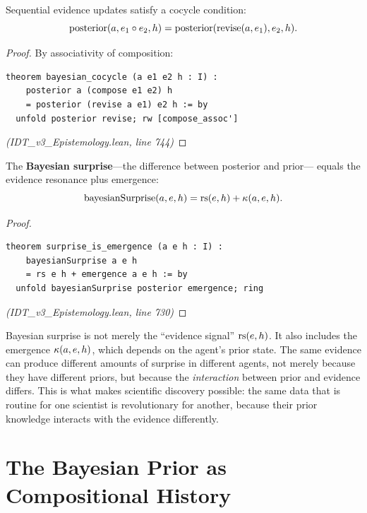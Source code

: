 \begin{theorem}
\label{thm:bayesian-cocycle}
Sequential evidence updates satisfy a cocycle condition:
\[
  \mathrm{posterior}(a, e_1 \circ e_2, h) = \mathrm{posterior}(\mathrm{revise}(a, e_1), e_2, h).
\]
\end{theorem}

\begin{proof}
By associativity of composition:
\begin{lstlisting}
theorem bayesian_cocycle (a e1 e2 h : I) :
    posterior a (compose e1 e2) h
    = posterior (revise a e1) e2 h := by
  unfold posterior revise; rw [compose_assoc']
\end{lstlisting}
\textit{(IDT\_v3\_Epistemology.lean, line 744)}
\end{proof}

\begin{theorem}
\label{thm:surprise-emergence}
The \textbf{Bayesian surprise}---the difference between posterior and prior---
equals the evidence resonance plus emergence:
\[
  \mathrm{bayesianSurprise}(a, e, h) = \mathrm{rs}(e, h) + \kappa(a, e, h).
\]
\end{theorem}

\begin{proof}
\begin{lstlisting}
theorem surprise_is_emergence (a e h : I) :
    bayesianSurprise a e h
    = rs e h + emergence a e h := by
  unfold bayesianSurprise posterior emergence; ring
\end{lstlisting}
\textit{(IDT\_v3\_Epistemology.lean, line 730)}
\end{proof}

\begin{interpretation}
Bayesian surprise is not merely the ``evidence signal'' $\mathrm{rs}(e,h)$. It also
includes the emergence $\kappa(a,e,h)$, which depends on the agent's prior
state. The same evidence can produce different amounts of surprise in different
agents, not merely because they have different priors, but because the
\emph{interaction} between prior and evidence differs. This is what makes
scientific discovery possible: the same data that is routine for one scientist
is revolutionary for another, because their prior knowledge interacts with the
evidence differently.
\end{interpretation}

\section{The Bayesian Prior as Compositional History}

